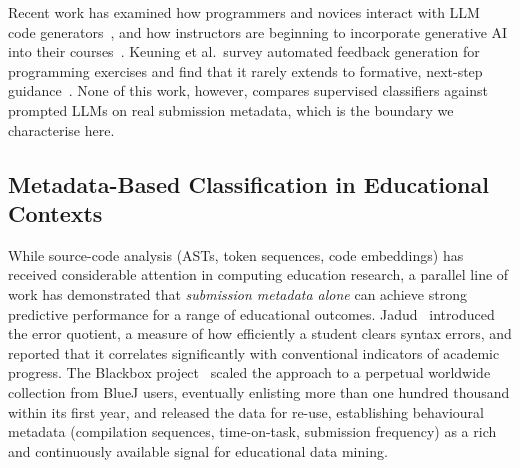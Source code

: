 \documentclass[acmsmall]{acmart}
\begin{document}
Recent work has examined how programmers and novices interact with LLM code
generators~\cite{barke2023grounded,becker2023programming,finnie2022robots}, and how
instructors are beginning to incorporate generative AI into their courses~\cite{prather2024instructors}. Keuning et al.\ survey automated feedback generation for
programming exercises and find that it rarely extends to formative, next-step
guidance~\cite{keuning2018systematic}. None of this work, however, compares
supervised classifiers against prompted LLMs on real submission metadata, which
is the boundary we characterise here.

\subsection{Metadata-Based Classification in Educational Contexts}

While source-code analysis (ASTs, token sequences, code embeddings) has
received considerable attention in computing education research, a parallel
line of work has demonstrated that \textit{submission metadata alone} can
achieve strong predictive performance for a range of educational outcomes.
Jadud~\cite{jadud2006methods} introduced the error quotient, a measure of how
efficiently a student clears syntax errors, and reported that it correlates
significantly with conventional indicators of academic progress. The Blackbox
project~\cite{brown2014blackbox} scaled the approach to a perpetual worldwide
collection from BlueJ users, eventually enlisting more than one hundred thousand within its
first year, and released the data for re-use, establishing behavioural metadata
(compilation sequences, time-on-task, submission frequency) as a rich and
continuously available signal for educational data mining.
\end{document}

